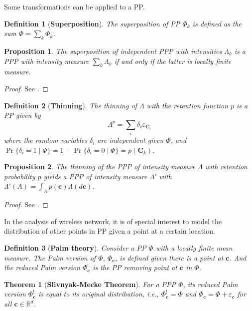 \documentclass[a4paper,twocolumn]{IEEEtran}
\newtheorem{definition}{\textbf{Definition}}
\newtheorem{proposition}{\textbf{Proposition}}
\newtheorem{theorem}{\textbf{Theorem}}
\begin{document}
Some transformations can be applied to a PP.
\begin{definition}[\textbf{Superposition}]
The superposition of PP $\Phi_k$ is defined as the sum $\Phi=\sum_k \Phi_k$. 	
\end{definition}
\begin{proposition}
The superposition of independent PPP with intensities $\Lambda_k$ is a PPP with intensity measure $\sum_k \Lambda_k$ if and only if the latter is locally finite measure.
\end{proposition}	
\begin{proof}
See \cite[Proposition 1.3.3]{Baccelli2009Vol1}.
\end{proof}
\begin{definition}[\textbf{Thinning}]
The thinning of $\Lambda$ with the retention function $p$ is a PP given by
\begin{displaymath}
\Lambda^p = \sum_i \delta_i \varepsilon_{\bm{C}_i} 
\end{displaymath}
where the random variables $\delta_i$ are independent given $\Phi$, and $\Pr\{\delta_i=1\mid \Phi\}=1-\Pr\{\delta_i=0\mid \Phi\}=p(\bm{C}_k)$.
\end{definition}
\begin{proposition}\label{prop:PPPthinning}
The thinning of the PPP of intensity measure $\Lambda$ with retention probability $p$ yields a PPP of intensity measure $\Lambda'$ with $\Lambda'(A)=\int_A p(\bm{c}) \Lambda(d\bm{c})$.
\end{proposition}
\begin{proof}
See \cite[Proposition 1.3.5]{Baccelli2009Vol1}.
\end{proof}
In the analysis of wireless network, it is of special interest to model the distribution of other points in PP given a point at a certain location.
\begin{definition}[\textbf{Palm theory}]
Consider a PP $\Phi$ with a locally finite mean measure. The Palm version of $\Phi$, $\Phi_{\bm{c}}$, is defined given there is a point at $\bm{c}$. And the reduced Palm version $\Phi_{\bm{c}}^!$ is the PP removing point at $\bm{c}$ in $\Phi$.  
\end{definition}
\begin{theorem}[\textbf{Slivnyak-Mecke Theorem}]
For a PPP $\Phi$, its reduced Palm version $\Phi_{\bm{c}}^!$ is equal to its original distribution, i.e., $\Phi_{\bm{c}}^! = \Phi$ and $\Phi_{\bm{c}} = \Phi+\varepsilon_{\bm{c}}$ for all $\bm{c}\in\mathbb{R}^d$.    
\end{theorem}
\end{document}

